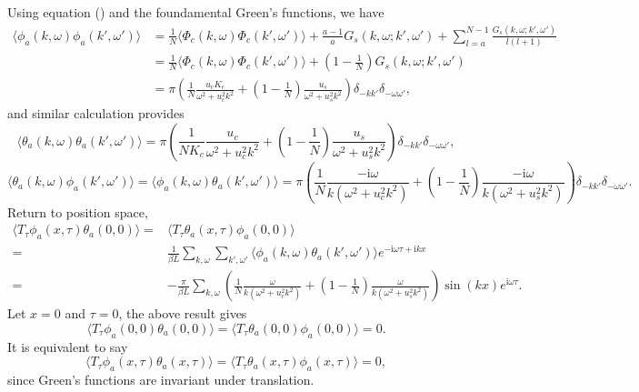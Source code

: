 \documentclass[10pt]{extarticle}
\newcommand{\dd}{\mathrm{d}}
\newcommand{\ii}{\mathrm{i}}
\begin{document}
Using equation (\theequation) and the foundamental Green's functions, we have
\begin{align*}
	\langle \phi_a(k,\omega)\phi_a(k',\omega')\rangle &=\frac{1}{N}\langle \Phi_c(k,\omega)\Phi_c(k',\omega')\rangle +\frac{a-1}{a}G_s(k,\omega;k',\omega')+\sum_{l=a}^{N-1}\frac{G_s(k,\omega;k',\omega')}{l(l+1)}\\
	&=\frac{1}{N}\langle \Phi_c(k,\omega)\Phi_c(k',\omega')\rangle+\left(1-\frac{1}{N}\right)G_s(k,\omega;k',\omega')\\
	&=\pi\left(\frac{1}{N}\frac{u_c K_c}{\omega^2+u_c^2k^2}+\left(1-\frac{1}{N}\right)\frac{u_s}{\omega^2+u_s^2k^2}\right)\delta_{-kk'}\delta_{-\omega\omega'},
\end{align*}
and similar calculation provides
\[
	\langle \theta_a(k,\omega)\theta_a(k',\omega')\rangle =\pi\left(\frac{1}{N K_c}\frac{u_c}{\omega^2+u_c^2k^2}+\left(1-\frac{1}{N}\right)\frac{u_s}{\omega^2+u_s^2k^2}\right)\delta_{-kk'}\delta_{-\omega\omega'},
\]
\[
	\langle \theta_a(k,\omega)\phi_a(k',\omega')\rangle =\langle \phi_a(k,\omega)\theta_a(k',\omega')\rangle =\pi\left(\frac{1}{N}\frac{-\ii\omega}{k(\omega^2+u_c^2k^2)}+\left(1-\frac{1}{N}\right)\frac{-\ii\omega}{k(\omega^2+u_s^2k^2)}\right)\delta_{-kk'}\delta_{-\omega\omega'}.
\]
Return to position space, 
\begin{equation}
\begin{aligned}
	\langle T_\tau\phi_a(x,\tau)\theta_a(0,0)\rangle=&\langle T_\tau\theta_a(x,\tau)\phi_a(0,0)\rangle \\
	=&\frac{1}{\beta L}\sum_{k,\omega}\sum_{k',\omega'}\langle \phi_a(k,\omega)\theta_a(k',\omega')\rangle e^{-\ii \omega\tau+\ii k x}\\
	=&-\frac{\pi}{\beta L}\sum_{k,\omega}\left(\frac{1}{N}\frac{\omega}{k(\omega^2+u_c^2k^2)}+\left(1-\frac{1}{N}\right)\frac{\omega}{k(\omega^2+u_s^2k^2)}\right)\sin(kx)e^{\ii\omega\tau}.
\end{aligned}
\end{equation}
Let $x=0$ and $\tau=0$, the above result gives
\[
	\langle T_\tau \phi_a(0,0)\theta_a(0,0)\rangle=\langle T_\tau \theta_a(0,0)\phi_a(0,0)\rangle=0.
\]
It is equivalent to say
\[
	\langle T_\tau \phi_a(x,\tau)\theta_a(x,\tau)\rangle=\langle T_\tau \theta_a(x,\tau)\phi_a(x,\tau)\rangle=0,
\]
since Green's functions are invariant under translation.
\end{document}
